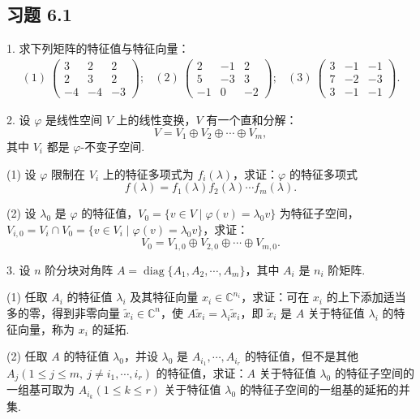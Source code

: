 \documentclass[UTF8,12pt,a4paper,fontset=fandol]{ctexart}
\begin{document}
\subsection*{习题 6.1}

1. 求下列矩阵的特征值与特征向量：
\[
\begin{array}{ccc}
(1)\ \left(\begin{array}{ccc}
3 & 2 & 2\\
2 & 3 & 2\\
-4 & -4 & -3
\end{array}\right);&
(2)\ \left(\begin{array}{ccc}
2 & -1 & 2\\
5 & -3 & 3\\
-1 & 0 & -2
\end{array}\right);&
(3)\ \left(\begin{array}{ccc}
3 & -1 & -1\\
7 & -2 & -3\\
3 & -1 & -1
\end{array}\right).
\end{array}
\]

2. 设 $\varphi$ 是线性空间 $V$ 上的线性变换，$V$ 有一个直和分解：
\[
V=V_1\oplus V_2\oplus\cdots\oplus V_m,
\]
其中 $V_i$ 都是 $\varphi$-不变子空间.

(1) 设 $\varphi$ 限制在 $V_i$ 上的特征多项式为 $f_i(\lambda)$，求证：$\varphi$ 的特征多项式
\[
f(\lambda)=f_1(\lambda)f_2(\lambda)\cdots f_m(\lambda).
\]

(2) 设 $\lambda_0$ 是 $\varphi$ 的特征值，$V_0=\{v\in V\mid \varphi(v)=\lambda_0v\}$ 为特征子空间，$V_{i,0}=V_i\cap V_0=\{v\in V_i\mid \varphi(v)=\lambda_0v\}$，求证：
\[
V_0=V_{1,0}\oplus V_{2,0}\oplus\cdots\oplus V_{m,0}.
\]

3. 设 $n$ 阶分块对角阵 $A=\operatorname{diag}\{A_1,A_2,\cdots,A_m\}$，其中 $A_i$ 是 $n_i$ 阶矩阵.

(1) 任取 $A_i$ 的特征值 $\lambda_i$ 及其特征向量 $x_i\in\mathbb{C}^{n_i}$，求证：可在 $x_i$ 的上下添加适当多的零，得到非零向量 $\widetilde{x}_i\in\mathbb{C}^n$，使 $A\widetilde{x}_i=\lambda_i\widetilde{x}_i$，即 $\widetilde{x}_i$ 是 $A$ 关于特征值 $\lambda_i$ 的特征向量，称为 $x_i$ 的延拓.

(2) 任取 $A$ 的特征值 $\lambda_0$，并设 $\lambda_0$ 是 $A_{i_1},\cdots,A_{i_r}$ 的特征值，但不是其他 $A_j(1\leq j\leq m,\ j\neq i_1,\cdots,i_r)$ 的特征值，求证：$A$ 关于特征值 $\lambda_0$ 的特征子空间的一组基可取为 $A_{i_k}(1\leq k\leq r)$ 关于特征值 $\lambda_0$ 的特征子空间的一组基的延拓的并集.
\end{document}
